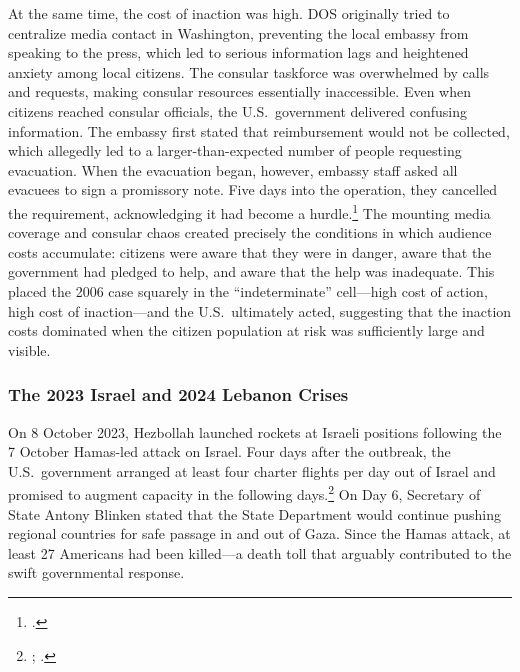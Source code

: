 \documentclass[12pt]{article}
\begin{document}
At the same time, the cost of inaction was high. DOS originally tried to centralize media contact in Washington, preventing the local embassy from speaking to the press, which led to serious information lags and heightened anxiety among local citizens. The consular taskforce was overwhelmed by calls and requests, making consular resources essentially inaccessible. Even when citizens reached consular officials, the U.S.\ government delivered confusing information. The embassy first stated that reimbursement would not be collected, which allegedly led to a larger-than-expected number of people requesting evacuation. When the evacuation began, however, embassy staff asked all evacuees to sign a promissory note. Five days into the operation, they cancelled the requirement, acknowledging it had become a hurdle.\footnote{\citet{GAO2007}.} The mounting media coverage and consular chaos created precisely the conditions in which audience costs accumulate: citizens were aware that they were in danger, aware that the government had pledged to help, and aware that the help was inadequate. This placed the 2006 case squarely in the ``indeterminate'' cell---high cost of action, high cost of inaction---and the U.S.\ ultimately acted, suggesting that the inaction costs dominated when the citizen population at risk was sufficiently large and visible.

\subsubsection{The 2023 Israel and 2024 Lebanon Crises}

On 8 October 2023, Hezbollah launched rockets at Israeli positions following the 7 October Hamas-led attack on Israel. Four days after the outbreak, the U.S.\ government arranged at least four charter flights per day out of Israel and promised to augment capacity in the following days.\footnote{\citet{Jalonick2023}; \citet{Ossoff2023}.} On Day 6, Secretary of State Antony Blinken stated that the State Department would continue pushing regional countries for safe passage in and out of Gaza. Since the Hamas attack, at least 27 Americans had been killed---a death toll that arguably contributed to the swift governmental response.
\end{document}
